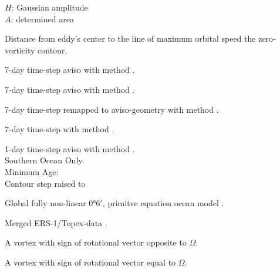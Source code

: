 \begin{fullwidth}
\begin{multicols}{2}
\begin{definition}
$H$: Gaussian amplitude\\
$A$: determined area\\
 \end{definition}
\begin{definition}\label{def:scale}
Distance from eddy's center to the line of maximum orbital speed \ie the zero-vorticity contour.
\end{definition}
\begin{definition}\label{def:aviI}
7-day time-step aviso with method \MI.
\end{definition}
\begin{definition}\label{def:aviII}
7-day time-step aviso with method \MII.
\end{definition}
\begin{definition}\label{def:p2aII}
7-day time-step \POP remapped to aviso-geometry with method \MII.
\end{definition}
\begin{definition}\label{def:pop7II}
7-day time-step \POP with method \MII.
\end{definition}
\begin{definition}\label{def:pop1IISO}
1-day time-step aviso with method \MII. \\Southern Ocean Only. \\Minimum Age:
  \\ Contour step raised to
\end{definition}
\begin{definition}\label{def:POP}
Global fully non-linear $\ang{0;6;}$,
 primitve equation ocean model \citet{Oestreicher}.
\end{definition}
\begin{definition}[\AVI]\label{def:AVISO}
Merged ERS-1/Topex-data \citet{Forget2010}.
\end{definition}
\begin{definition}\label{def:AC}
A vortex with sign of rotational vector opposite to \href{def:Omega}{$\Omega$}.
\end{definition}
\begin{definition}[Cyclone (\C)]\label{def:C}
A vortex with sign of rotational vector equal to \href{def:Omega}{$\Omega$}.
\end{definition}


\end{multicols}
\end{fullwidth}

